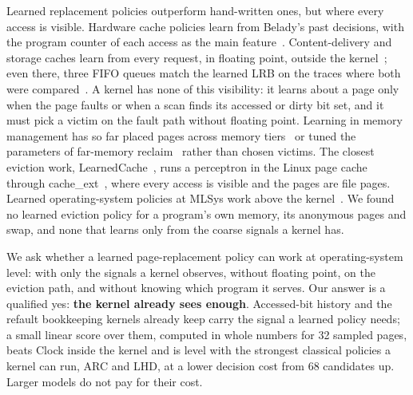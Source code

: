 \documentclass{article}
\newcommand{\clock}{Clock\xspace}
\newcommand{\belady}{Belady\xspace}
\begin{document}
Learned replacement policies outperform hand-written ones, but where every access is
visible. Hardware cache policies learn from \belady's past decisions, with the program
counter of each access as the main feature~\citep{jain2016hawkeye,shi2019glider,shah2022mockingjay}.
Content-delivery and storage caches learn from every request, in floating point, outside
the kernel~\citep{song2020lrb,song2023halp,vietri2018lecar,rodriguez2021cacheus}; even
there, three FIFO queues match the learned LRB on the traces where both were
compared~\citep{yang2023s3fifo}. A kernel has none of this visibility: it learns about a
page only when the page faults or when a scan finds its accessed or dirty bit set, and it
must pick a victim on the fault path without floating point. Learning in memory management
has so far placed pages across memory tiers~\citep{doudali2019kleio,ramaswamy2026xtier} or
tuned the parameters of far-memory reclaim~\citep{lagarcavilla2019farmemory} rather than
chosen victims. The
closest eviction work, LearnedCache~\citep{qi2026learnedcache}, runs a perceptron in the
Linux page cache through cache\_ext~\citep{zussman2025cacheext}, where every access is
visible and the pages are file pages. Learned operating-system policies at MLSys work above
the kernel~\citep{barbalho2023vmalloc,ling2025lava,zhao2026catur,yang2025byom}. We found no
learned eviction policy for a program's own memory, its anonymous pages and swap, and none
that learns only from the coarse signals a kernel has.

We ask whether a learned page-replacement policy can work at operating-system level:
with only the signals a kernel observes, without floating point, on the eviction path,
and without knowing which program it serves. Our answer is a qualified yes:
\textbf{the kernel already sees enough}. Accessed-bit history and the refault
bookkeeping kernels already keep carry the signal a learned policy needs; a small linear
score over them, computed in whole numbers for 32 sampled pages, beats \clock inside the
kernel and is level with the strongest classical policies a kernel can run, ARC and LHD,
at a lower decision cost from 68 candidates up. Larger models do not pay for their cost.
\end{document}
